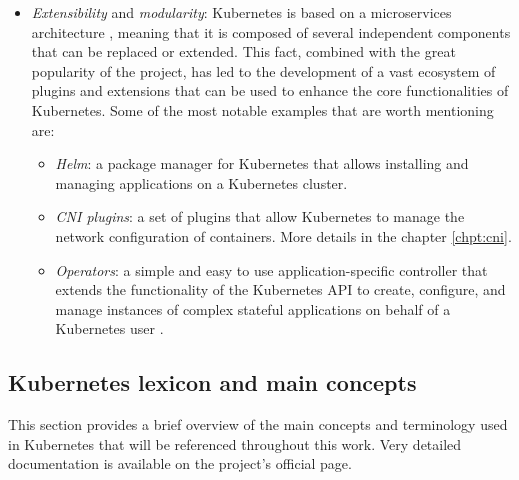 \begin{itemize}
   \item \textit{Extensibility} and \textit{modularity}: Kubernetes is based on
     a microservices architecture \cite{Ding2023}, meaning that it is composed
     of several independent components that can be replaced or extended.
     This fact, combined with the great popularity of the project, has led to
     the development of a vast ecosystem of plugins and extensions that can be
     used to enhance the core functionalities of Kubernetes.
     Some of the most notable examples that are worth mentioning are:
     \begin{itemize}
       \itemsep0em
       \item \textit{Helm}: a package manager for Kubernetes that allows
         installing and managing applications on a Kubernetes cluster.
       \item \textit{CNI plugins}: a set of plugins that allow Kubernetes to
         manage the network configuration of containers. More details in the chapter
         \ref{chpt:cni}.
       \item \textit{Operators}: a simple and easy to use application-specific
         controller that extends the functionality of the Kubernetes API to
         create, configure, and manage instances of complex stateful
         applications on behalf of a Kubernetes user \cite{bookofkubernetes}.
     \end{itemize}
\end{itemize}


\subsection{Kubernetes lexicon and main concepts}


This section provides a brief overview of the main concepts and
terminology used in Kubernetes that will be referenced throughout this work.
Very detailed documentation is available on the project's official page.


